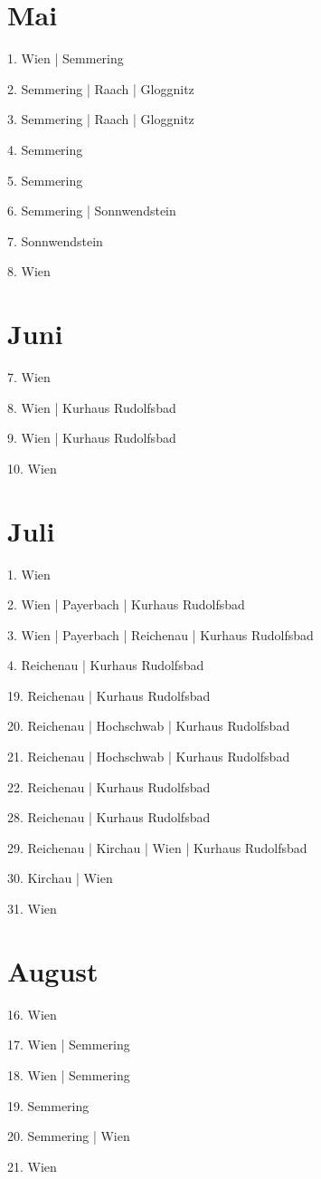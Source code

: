 \documentclass[twoside=false,titlepage=false,open=any, parskip=never, fontsize=10pt, headings=small, chapterprefix=false, appendixprefix=false, DIV=15]{scrbook}
\begin{document}
\begin{multicols}{3}
            \section*{Mai}
            1. Wien | Semmering\par
            2. Semmering | Raach | Gloggnitz\par
            3. Semmering | Raach | Gloggnitz\par
            4. Semmering\par
            5. Semmering\par
            6. Semmering | Sonnwendstein\par
            7. Sonnwendstein\par
            8. Wien\par
            \section*{Juni}
            7. Wien\par
            8. Wien | Kurhaus Rudolfsbad\par
            9. Wien | Kurhaus Rudolfsbad\par
            10. Wien\par
            \section*{Juli}
            1. Wien\par
            2. Wien | Payerbach | Kurhaus Rudolfsbad\par
            3. Wien | Payerbach | Reichenau | Kurhaus Rudolfsbad\par
            4. Reichenau | Kurhaus Rudolfsbad\par
            19. Reichenau | Kurhaus Rudolfsbad\par
            20. Reichenau | Hochschwab | Kurhaus Rudolfsbad\par
            21. Reichenau | Hochschwab | Kurhaus Rudolfsbad\par
            22. Reichenau | Kurhaus Rudolfsbad\par
            28. Reichenau | Kurhaus Rudolfsbad\par
            29. Reichenau | Kirchau | Wien | Kurhaus Rudolfsbad\par
            30. Kirchau | Wien\par
            31. Wien\par
            \section*{August}
            16. Wien\par
            17. Wien | Semmering\par
            18. Wien | Semmering\par
            19. Semmering\par
            20. Semmering | Wien\par
            21. Wien\par

\end{multicols}
\end{document}
